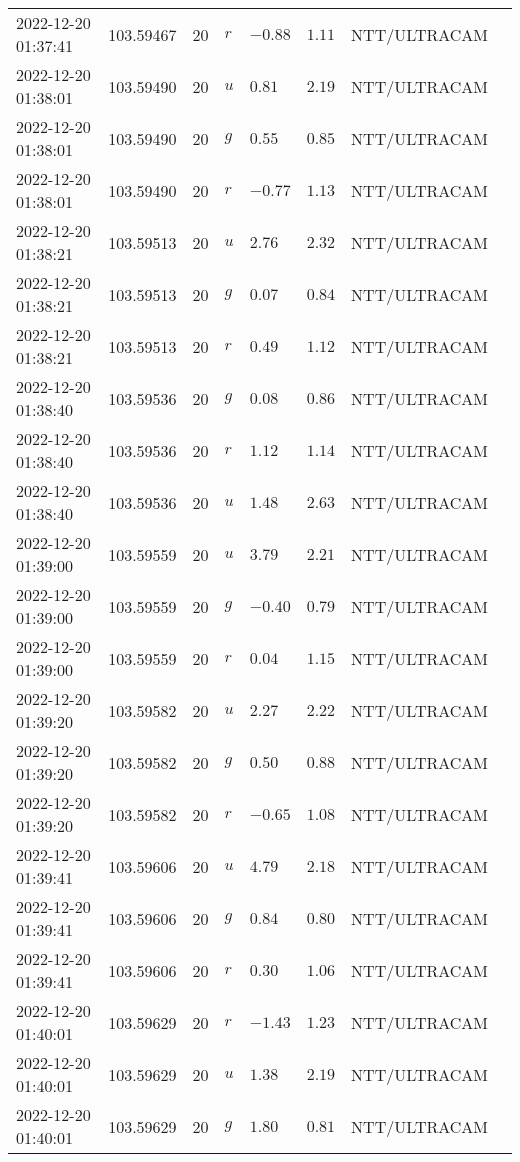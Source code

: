 \documentclass{nature_plusfigure}
\begin{document}
\begin{supplement}
\begin{center}
\begin{longtable}{llllllll}
2022-12-20 01:37:41 & 103.59467 & 20 & $r$ & $-0.88$ & $1.11$ & NTT/ULTRACAM &  \\ 
2022-12-20 01:38:01 & 103.59490 & 20 & $u$ & $0.81$ & $2.19$ & NTT/ULTRACAM &  \\ 
2022-12-20 01:38:01 & 103.59490 & 20 & $g$ & $0.55$ & $0.85$ & NTT/ULTRACAM &  \\ 
2022-12-20 01:38:01 & 103.59490 & 20 & $r$ & $-0.77$ & $1.13$ & NTT/ULTRACAM &  \\ 
2022-12-20 01:38:21 & 103.59513 & 20 & $u$ & $2.76$ & $2.32$ & NTT/ULTRACAM &  \\ 
2022-12-20 01:38:21 & 103.59513 & 20 & $g$ & $0.07$ & $0.84$ & NTT/ULTRACAM &  \\ 
2022-12-20 01:38:21 & 103.59513 & 20 & $r$ & $0.49$ & $1.12$ & NTT/ULTRACAM &  \\ 
2022-12-20 01:38:40 & 103.59536 & 20 & $g$ & $0.08$ & $0.86$ & NTT/ULTRACAM &  \\ 
2022-12-20 01:38:40 & 103.59536 & 20 & $r$ & $1.12$ & $1.14$ & NTT/ULTRACAM &  \\ 
2022-12-20 01:38:40 & 103.59536 & 20 & $u$ & $1.48$ & $2.63$ & NTT/ULTRACAM &  \\ 
2022-12-20 01:39:00 & 103.59559 & 20 & $u$ & $3.79$ & $2.21$ & NTT/ULTRACAM &  \\ 
2022-12-20 01:39:00 & 103.59559 & 20 & $g$ & $-0.40$ & $0.79$ & NTT/ULTRACAM &  \\ 
2022-12-20 01:39:00 & 103.59559 & 20 & $r$ & $0.04$ & $1.15$ & NTT/ULTRACAM &  \\ 
2022-12-20 01:39:20 & 103.59582 & 20 & $u$ & $2.27$ & $2.22$ & NTT/ULTRACAM &  \\ 
2022-12-20 01:39:20 & 103.59582 & 20 & $g$ & $0.50$ & $0.88$ & NTT/ULTRACAM &  \\ 
2022-12-20 01:39:20 & 103.59582 & 20 & $r$ & $-0.65$ & $1.08$ & NTT/ULTRACAM &  \\ 
2022-12-20 01:39:41 & 103.59606 & 20 & $u$ & $4.79$ & $2.18$ & NTT/ULTRACAM &  \\ 
2022-12-20 01:39:41 & 103.59606 & 20 & $g$ & $0.84$ & $0.80$ & NTT/ULTRACAM &  \\ 
2022-12-20 01:39:41 & 103.59606 & 20 & $r$ & $0.30$ & $1.06$ & NTT/ULTRACAM &  \\ 
2022-12-20 01:40:01 & 103.59629 & 20 & $r$ & $-1.43$ & $1.23$ & NTT/ULTRACAM &  \\ 
2022-12-20 01:40:01 & 103.59629 & 20 & $u$ & $1.38$ & $2.19$ & NTT/ULTRACAM &  \\ 
2022-12-20 01:40:01 & 103.59629 & 20 & $g$ & $1.80$ & $0.81$ & NTT/ULTRACAM &  \\ 

\end{longtable}
\end{center}
\end{supplement}
\end{document}
